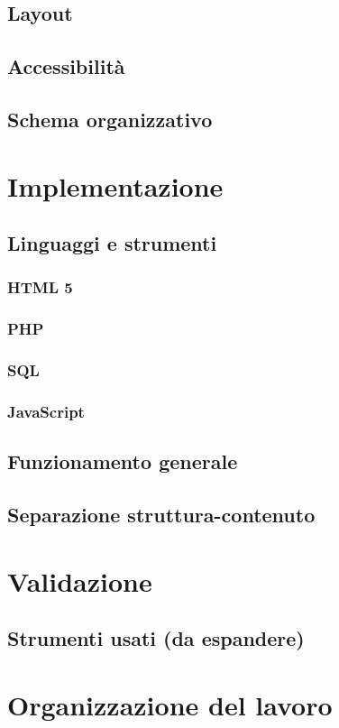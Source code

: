 \documentclass[a4paper, oneside, openany, dvipsnames, table]{article}
\begin{document}
	\subsection{Layout}
		
	\subsection{Accessibilità}
		
	\subsection{Schema organizzativo}
		

\newpage
\section{Implementazione}
	
	\subsection{Linguaggi e strumenti}
		
		\subsubsection{HTML 5}
			
		\subsubsection{PHP}
			
		\subsubsection{SQL}
			
		\subsubsection{JavaScript}
			
	\subsection{Funzionamento generale}
		
	\subsection{Separazione struttura-contenuto}
		
	
\newpage
\section{Validazione}
	
	\subsection{Strumenti usati (da espandere)}
		
	
\newpage
\section{Organizzazione del lavoro}
	
\end{document}
